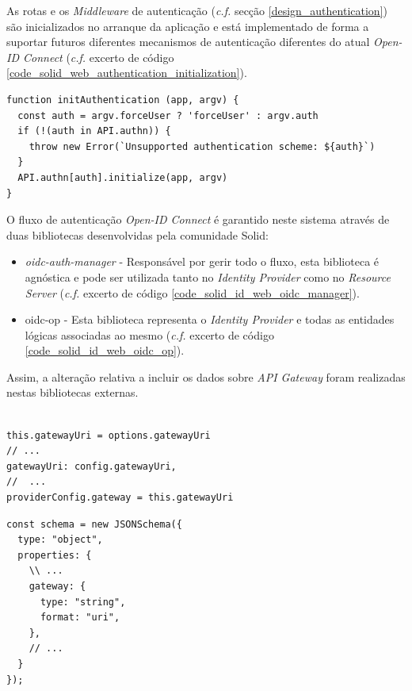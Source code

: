 As rotas e os \emph{Middleware} de autenticação (\emph{c.f.} secção \ref{design_authentication}) são inicializados no arranque da aplicação e está implementado de forma a suportar futuros diferentes mecanismos de autenticação diferentes do atual \emph{Open-ID Connect} (\emph{c.f.} excerto de código \ref{code_solid_web_authentication_initialization}).

\begin{lstlisting}[caption={Inicialização da autenticação no arranque}, label={code_solid_web_authentication_initialization}]
function initAuthentication (app, argv) {
  const auth = argv.forceUser ? 'forceUser' : argv.auth
  if (!(auth in API.authn)) {
    throw new Error(`Unsupported authentication scheme: ${auth}`)
  }
  API.authn[auth].initialize(app, argv)
}
\end{lstlisting}

O fluxo de autenticação \emph{Open-ID Connect} é garantido neste sistema através de duas bibliotecas desenvolvidas pela comunidade Solid:
\begin{itemize}
    \item \emph{oidc-auth-manager} - Responsável por gerir todo o fluxo, esta biblioteca é agnóstica e pode ser utilizada tanto no \emph{Identity Provider} como no \emph{Resource Server} (\emph{c.f.} excerto de código \ref{code_solid_id_web_oidc_manager}).
    \item oidc-op - Esta biblioteca representa o \emph{Identity Provider} e todas as entidades lógicas associadas ao mesmo (\emph{c.f.} excerto de código \ref{code_solid_id_web_oidc_op}).
\end{itemize}

Assim, a alteração relativa a incluir os dados sobre \emph{API Gateway} foram realizadas nestas bibliotecas externas.

\begin{lstlisting}[caption={Alteração ao \emph{OIDCManager} na biblioteca nativa do \emph{Solid} \emph{oidc-auth-manager}}, label={code_solid_id_web_oidc_manager}]

this.gatewayUri = options.gatewayUri
// ...
gatewayUri: config.gatewayUri,
//  ...
providerConfig.gateway = this.gatewayUri

\end{lstlisting}

\begin{lstlisting}[caption={Alteração ao \emph{ProviderSchema} na biblioteca \emph{oidc-op}}, label={code_solid_id_web_oidc_op}]
const schema = new JSONSchema({
  type: "object",
  properties: {
    \\ ...
    gateway: {
      type: "string",
      format: "uri",
    },
    // ...
  }  
});

\end{lstlisting}

